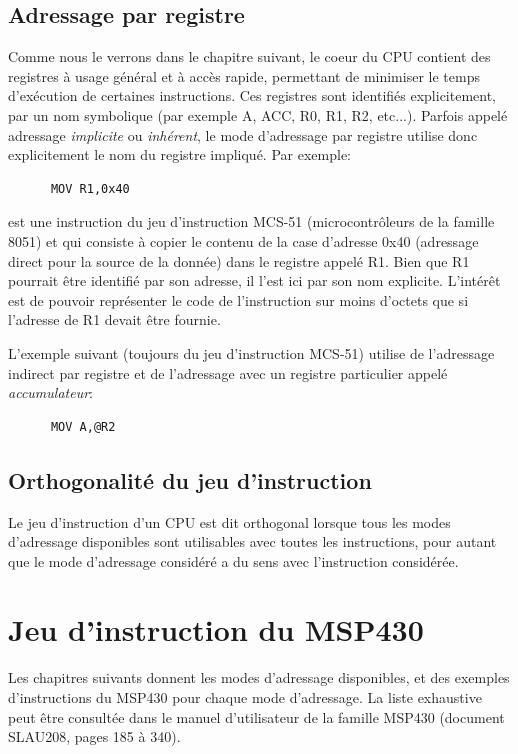 \subsection{Adressage par registre}
Comme nous le verrons dans le chapitre suivant, le coeur du CPU contient des registres à usage général et à accès rapide, permettant de minimiser le temps d'exécution de certaines instructions. Ces registres sont identifiés explicitement, par un nom symbolique (par exemple A, ACC, R0, R1, R2, etc...).
Parfois appelé adressage \textit{implicite} ou \textit{inhérent}, le mode d'adressage par registre utilise donc explicitement le nom du registre impliqué. Par exemple:
\lstset{style=customc}
\begin{lstlisting}
      MOV R1,0x40
\end{lstlisting}
est une instruction du jeu d'instruction MCS-51 (microcontrôleurs de la famille 8051) et qui consiste à copier le contenu de la case d'adresse 0x40 (adressage direct pour la source de la donnée) dans le registre appelé R1. Bien que R1 pourrait être identifié par son adresse, il l'est ici par son nom explicite. L'intérêt est de pouvoir représenter le code de l'instruction sur moins d'octets que si l'adresse de R1 devait être fournie.

L'exemple suivant (toujours du jeu d'instruction MCS-51) utilise de l'adressage indirect par registre et de l'adressage avec un registre particulier appelé \textit{accumulateur}:
\lstset{style=customc}
\begin{lstlisting}
      MOV A,@R2
\end{lstlisting}

\subsection{Orthogonalité du jeu d'instruction}
Le jeu d'instruction d'un CPU est dit orthogonal lorsque tous les modes d'adressage disponibles sont utilisables avec toutes les instructions, pour autant que le mode d'adressage considéré a du sens avec l'instruction considérée.

\section{Jeu d'instruction du MSP430}
Les chapitres suivants donnent les modes d'adressage disponibles, et des exemples d'instructions du MSP430 pour chaque mode d'adressage. La liste exhaustive peut être consultée dans le manuel d'utilisateur de la famille MSP430 (document SLAU208, pages 185 à 340).

